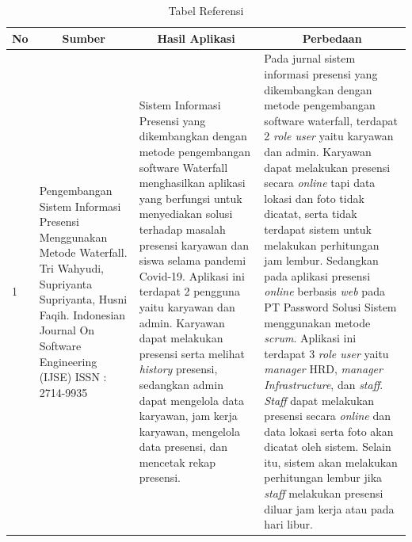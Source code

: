 \begin{longtable}{ |p{0.5cm}|p{3cm}|p{7cm}|p{12cm}|  }
	\caption{Tabel Referensi}\label{tab:referensi} \\
	\hline
	\multicolumn{1}{|c|}{\textbf{No}} & \multicolumn{1}{|c|}{\textbf{Sumber}} & \multicolumn{1}{|c|}{\textbf{Hasil Aplikasi}} & \multicolumn{1}{|c|}{\textbf{Perbedaan}} \\ \hline
	1 
 & Pengembangan Sistem Informasi Presensi Menggunakan Metode Waterfall.
 \newline Tri Wahyudi, Supriyanta Supriyanta, Husni Faqih.
 \newline Indonesian Journal On Software Engineering (IJSE)
 \newline ISSN : 2714-9935 
 & Sistem Informasi Presensi yang dikembangkan dengan metode pengembangan software Waterfall menghasilkan aplikasi yang berfungsi untuk menyediakan solusi terhadap masalah presensi karyawan dan siswa selama pandemi Covid-19. Aplikasi ini terdapat 2 pengguna yaitu karyawan dan admin. Karyawan dapat melakukan presensi serta melihat \textit{history} presensi, sedangkan admin dapat mengelola data karyawan, jam kerja karyawan, mengelola data presensi, dan mencetak rekap presensi. 
 & Pada jurnal sistem informasi presensi yang dikembangkan dengan metode pengembangan software waterfall, terdapat 2 \textit{role user} yaitu karyawan dan admin. Karyawan dapat melakukan presensi secara \textit{online} tapi data lokasi dan foto tidak dicatat, serta tidak terdapat sistem untuk melakukan perhitungan jam lembur.
 \newline 
  \newline
  Sedangkan pada aplikasi presensi \textit{online} berbasis \textit{web} pada PT Password Solusi Sistem menggunakan metode \textit{scrum}. Aplikasi ini terdapat 3 \textit{role user} yaitu \textit{manager} HRD, \textit{manager Infrastructure}, dan \textit{staff}. \textit{Staff} dapat melakukan presensi secara \textit{online} dan data lokasi serta foto akan dicatat oleh sistem. Selain itu, sistem akan melakukan perhitungan lembur jika \textit{staff} melakukan presensi diluar jam kerja atau pada hari libur.
 \\ \hline
 

\end{longtable}
